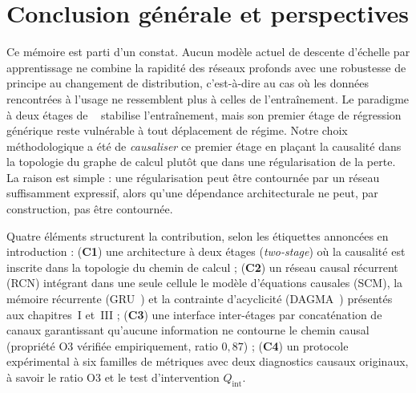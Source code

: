 \chapter*{Conclusion générale et perspectives}


\vspace{1em}

\label{concl:probl}

Ce mémoire est parti d'un constat. Aucun modèle actuel de descente d'échelle par apprentissage ne combine la rapidité des réseaux profonds avec une robustesse de principe au changement de distribution, c'est-à-dire au cas où les données rencontrées à l'usage ne ressemblent plus à celles de l'entraînement. Le paradigme à deux étages de \CorrDiff{}~\cite{mardani_corrdiff_2023} stabilise l'entraînement, mais son premier étage de régression générique reste vulnérable à tout déplacement de régime. Notre choix méthodologique a été de \emph{causaliser} ce premier étage en plaçant la causalité dans la topologie du graphe de calcul plutôt que dans une régularisation de la perte. La raison est simple : une régularisation peut être contournée par un réseau suffisamment expressif, alors qu'une dépendance architecturale ne peut, par construction, pas être contournée.

Quatre éléments structurent la contribution, selon les étiquettes annoncées en introduction : (\textbf{C1}) une architecture à deux étages (\emph{two-stage}) où la causalité est inscrite dans la topologie du chemin de calcul ; (\textbf{C2}) un réseau causal récurrent (RCN) intégrant dans une seule cellule le modèle d'équations causales (SCM), la mémoire récurrente (GRU~\cite{cho_gru_2014}) et la contrainte d'acyclicité (DAGMA~\cite{bello_dagma_2022}) présentés aux chapitres~I et~III ; (\textbf{C3}) une interface inter-étages par concaténation de canaux garantissant qu'aucune information ne contourne le chemin causal (propriété O3 vérifiée empiriquement, ratio $0{,}87$) ; (\textbf{C4}) un protocole expérimental à six familles de métriques avec deux diagnostics causaux originaux, à savoir le ratio O3 et le test d'intervention $Q_{\mathrm{int}}$.

